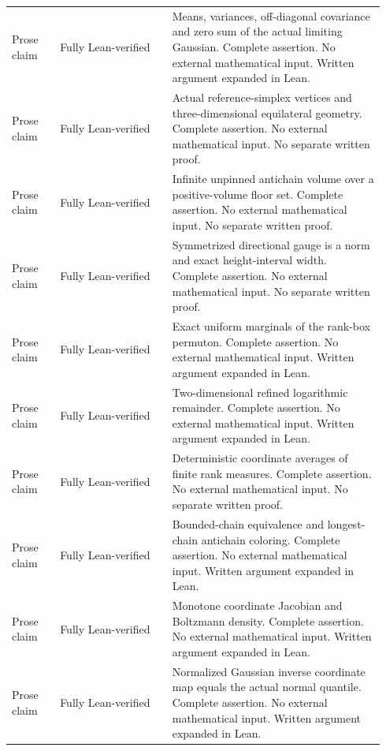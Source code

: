\begin{longtable}{@{}p{0.12\linewidth}p{0.29\linewidth}p{0.53\linewidth}@{}}
Prose claim & Fully Lean-verified & Means, variances, off-diagonal covariance and zero sum of the actual limiting Gaussian. Complete assertion. No external mathematical input. Written argument expanded in Lean. \\

Prose claim & Fully Lean-verified & Actual reference-simplex vertices and three-dimensional equilateral geometry. Complete assertion. No external mathematical input. No separate written proof. \\

Prose claim & Fully Lean-verified & Infinite unpinned antichain volume over a positive-volume floor set. Complete assertion. No external mathematical input. No separate written proof. \\

Prose claim & Fully Lean-verified & Symmetrized directional gauge is a norm and exact height-interval width. Complete assertion. No external mathematical input. No separate written proof. \\

Prose claim & Fully Lean-verified & Exact uniform marginals of the rank-box permuton. Complete assertion. No external mathematical input. Written argument expanded in Lean. \\

Prose claim & Fully Lean-verified & Two-dimensional refined logarithmic remainder. Complete assertion. No external mathematical input. Written argument expanded in Lean. \\

Prose claim & Fully Lean-verified & Deterministic coordinate averages of finite rank measures. Complete assertion. No external mathematical input. No separate written proof. \\

Prose claim & Fully Lean-verified & Bounded-chain equivalence and longest-chain antichain coloring. Complete assertion. No external mathematical input. Written argument expanded in Lean. \\

Prose claim & Fully Lean-verified & Monotone coordinate Jacobian and Boltzmann density. Complete assertion. No external mathematical input. Written argument expanded in Lean. \\

Prose claim & Fully Lean-verified & Normalized Gaussian inverse coordinate map equals the actual normal quantile. Complete assertion. No external mathematical input. Written argument expanded in Lean. \\


\end{longtable}
